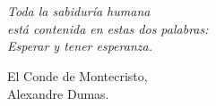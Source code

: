 \cleardoublepage %
\chapter*{}
\setlength{\leftmargin}{0.5\textwidth}
\setlength{\parsep}{0cm}
\addtolength{\topsep}{0.5cm}
\begin{flushright}
\small\em{
Toda la sabiduría humana\\
está contenida en estas dos palabras:\\ 
Esperar y tener esperanza.
}
\end{flushright}
\begin{flushright}
\small{
El Conde de Montecristo, \\
Alexandre Dumas.
}
\end{flushright}
\cleardoublepage %
